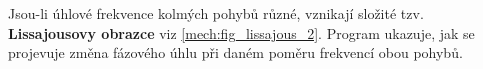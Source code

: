       Jsou-li úhlové frekvence kolmých pohybů různé, vznikají složité tzv. \textbf{Lissajousovy obrazce} viz 
      \ref{mech:fig_lissajous_2}. Program ukazuje, jak se projevuje změna fázového úhlu při daném poměru 
      frekvencí obou pohybů.

        
        \begin{lstlisting}[caption=\texttt{Lissajous.m}vykreslí skládání harmonických pohybů v kolmých 
        směrech.]
        \end{lstlisting}
